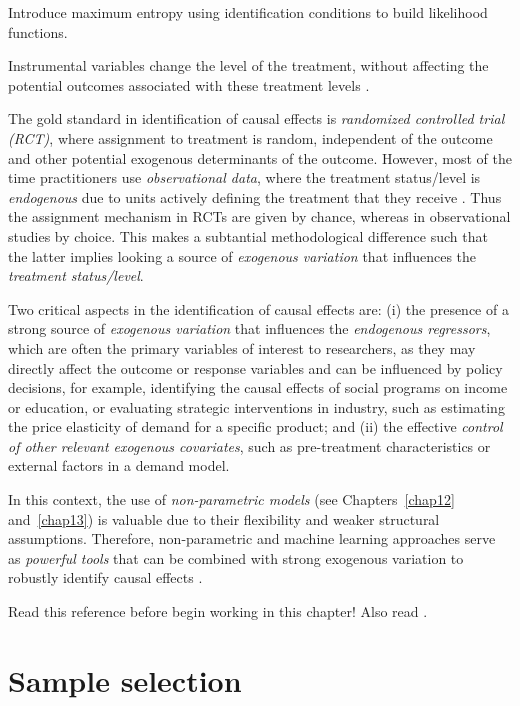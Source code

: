 Introduce maximum entropy using identification conditions to build likelihood functions.

Instrumental variables change the level of the treatment, without affecting the potential outcomes associated with these treatment levels \cite{imbens2014ivperspective}.

 
 
The gold standard in identification of causal effects is \textit{randomized controlled trial (RCT)}, where assignment to treatment is random, independent of the outcome and other potential exogenous determinants of the outcome. However, most of the time practitioners use \textit{observational data}, where the treatment status/level is \textit{endogenous} due to units actively defining the treatment that they receive \cite{imbens2014ivperspective}. Thus the assignment mechanism in RCTs are given by chance, whereas in observational studies by choice. This makes a subtantial methodological difference such that the latter implies looking a source of \textit{exogenous variation} that influences the \textit{treatment status/level}.

Two critical aspects in the identification of causal effects are: (i) the presence of a strong source of \textit{exogenous variation} that influences the \textit{endogenous regressors}, which are often the primary variables of interest to researchers, as they may directly affect the outcome or response variables and can be influenced by policy decisions, for example, identifying the causal effects of social programs on income or education, or evaluating strategic interventions in industry, such as estimating the price elasticity of demand for a specific product; and (ii) the effective \textit{control of other relevant exogenous covariates}, such as pre-treatment characteristics or external factors in a demand model.

In this context, the use of \textit{non-parametric models} (see Chapters~\ref{chap12} and~\ref{chap13}) is valuable due to their flexibility and weaker structural assumptions. Therefore, non-parametric and machine learning approaches serve as \textit{powerful tools} that can be combined with strong exogenous variation to robustly identify causal effects \cite{chernozhukov2018double,chernozhukov2024applied}.


Read this reference \cite{iacovone2023bayesian} before begin working in this chapter! Also read \cite{imbens1997bayesian}.



\section{Sample selection}\label{sec12_2}
\cite{greenberg2012introduction}

